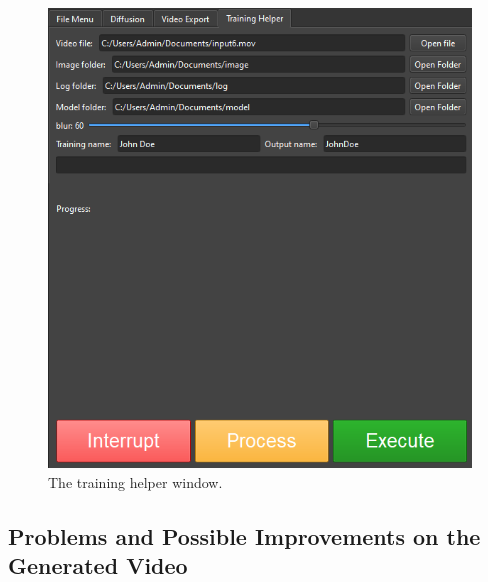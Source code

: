 \documentclass[sn-mathphys,Numbered]{sn-jnl}
\theoremstyle{thmstyleone}%
\theoremstyle{thmstyletwo}%
\theoremstyle{thmstylethree}%
\begin{document}
\begin{figure}[t]
	\centering
	\includegraphics[scale=0.44, keepaspectratio]{img/project_img/training-help.png}
	\caption{The training helper window.}\label{fig:training-helper}
\end{figure}



\subsection{Problems and Possible Improvements on the Generated Video}
\end{document}
